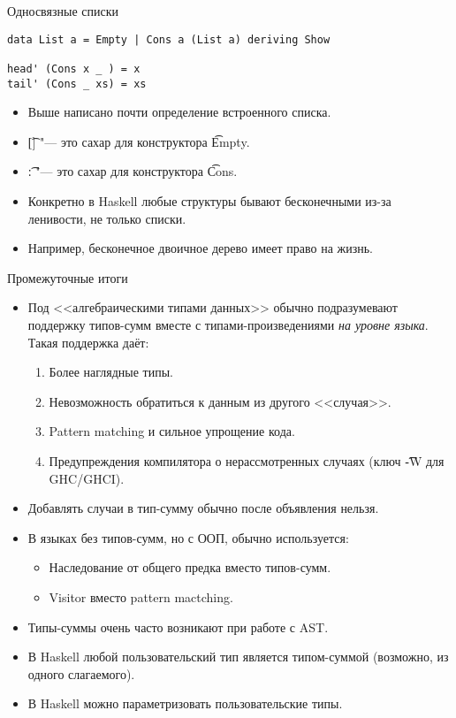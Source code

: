 \begin{frame}[fragile]{Односвязные списки}
\begin{verbatim}
data List a = Empty | Cons a (List a) deriving Show

head' (Cons x _ ) = x
tail' (Cons _ xs) = xs
\end{verbatim}
	\begin{itemize}
		\item Выше написано почти определение встроенного списка.
		\item \t{[]} "--- это сахар для конструктора \t{Empty}.
		\item \t{:} "--- это сахар для конструктора \t{Cons}.
		\item Конкретно в Haskell любые структуры бывают бесконечными из-за ленивости, не только списки.
		\item Например, бесконечное двоичное дерево имеет право на жизнь.
	\end{itemize}
\end{frame}

\begin{frame}{Промежуточные итоги}
	\begin{itemize}
		\item
			Под <<алгебраическими типами данных>> обычно подразумевают поддержку типов-сумм вместе с типами-произведениями \textit{на уровне языка}.
			Такая поддержка даёт:
			\begin{enumerate}
				\item Более наглядные типы.
				\item Невозможность обратиться к данным из другого <<случая>>.
				\item Pattern matching и сильное упрощение кода.
				\item Предупреждения компилятора о нерассмотренных случаях (ключ \t{-W} для GHC/GHCI).
			\end{enumerate}
		\item Добавлять случаи в тип-сумму обычно после объявления нельзя.
		\item В языках без типов-сумм, но с ООП, обычно используется:
			\begin{itemize}
				\item Наследование от общего предка вместо типов-сумм.
				\item Visitor вместо pattern mactching.
			\end{itemize}
		\item Типы-суммы очень часто возникают при работе с AST.
		\item В Haskell любой пользовательский тип является типом-суммой (возможно, из одного слагаемого).
		\item В Haskell можно параметризовать пользовательские типы.
	\end{itemize}
\end{frame}

